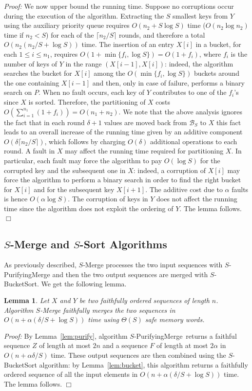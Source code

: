 \documentclass[review,number]{elsarticle}
\newcommand{\BO}[1]{{O}\left(#1\right)}
\newcommand{\BT}[1]{{\Theta}\left(#1\right)}
\newtheorem{lemma}{Lemma}
\renewenvironment{proof}{\begin{trivlist}
                         \item[] {\em Proof:}}{\hfill $\Box$
                       \end{trivlist}}
\newcommand{\B}{\mathcal{B}}
\newcommand{\SMerge}{$S$-\textsf{Merge}}
\newcommand{\SSort}{$S$-\textsf{Sort}}
\newcommand{\SPurifyingMerge}{$S$-\textsf{PurifyingMerge}}
\newcommand{\SBucketSort}{$S$-\textsf{BucketSort}}
\begin{document}
\begin{proof}
We now upper bound the running time. Suppose no corruptions occur during the
execution of the algorithm. Extracting the $S$ smallest keys from $Y$ using the
auxiliary priority queue requires $\BO{n_2+S\log S}$ time ($\BO{n_2 \log n_2}$
time if $n_2<S$) for each of the $\lceil n_2/S\rceil$ rounds, and therefore a
total $\BO{n_2 (n_2/S +\log S)}$ time. The insertion of an entry $X[i]$ in a
bucket, for
each $1\leq i\leq n_1$, requires $\BO{1+\min\{f_i, \log S\}}=\BO{1+f_i}$, where
$f_i$ is the number of keys of $Y$ in the range $(X[i-1], X[i])$: indeed, the
algorithm searches the bucket for $X[i]$ among the $\BO{\min\{f_i, \log S\}}$
buckets around
the
one containing $X[i-1]$ and then, only in case of failure, performs a binary
search on $P$. When no fault occurs, each key of $Y$ contributes to one of the
$f_i$'s  since $X$ is sorted. Therefore,  the partitioning of $X$ costs
$\BO{\sum_{i=1}^{n_1} (1+f_i)} = \BO{n_1 + n_2}$. We note that the above
analysis ignores the fact that in each round $\delta+1$ values are moved back
from $\B_{S}$ to $X$ this fact
leads to an overall increase of the running time given by an additive component
$\BO{\delta \lceil n_2/S\rceil}$, which follows by charging $\BO{\delta}$
additional operations to each round. A fault in $X$ may affect the running time
required for partitioning $X$. In particular, each fault may force the algorithm
to pay $\BO{\log S}$ for the corrupted key and the subsequent one in $X$:
indeed, a corruption of $X[i]$ may force the algorithm to perform a binary
search in order to find the right bucket for $X[i]$ and for the subsequent
key $X[i+1]$. The additive cost due to $\alpha$ faults is hence $\BO{\alpha \log
S}$. The corruption of keys in $Y$ does not affect the running time since the
algorithm does not exploit the ordering of $Y$. The lemma follows.
\end{proof}

\subsection[SMerge and SSort Algorithms]{\SMerge{} and \SSort{}
Algorithms}\label{sec:merge} As previously described, \SMerge{} processes the
two input sequences with \SPurifyingMerge{} and then the two output sequences
are merged with \SBucketSort{}. We get the following lemma.
\begin{lemma}\label{lem:merge}
Let $X$ and $Y$ be two faithfully ordered sequences of length $n$. Algorithm
\SMerge{} faithfully merges the two sequences in $\BO{n + \alpha \left(\delta/S
+ \log S\right)}$ time  using $\BT{S}$ safe
memory words. 
\end{lemma}
\begin{proof}
By Lemma~\ref{lem:purify}, algorithm \SPurifyingMerge\ returns a faithful
sequence $Z$ of length at most $2n$ and a
sequence $F$ of length at most $2\alpha$ in $\BO{n+\alpha \delta /S}$ time.
These output sequences are then combined using the \SBucketSort{} algorithm:
by Lemma~\ref{lem:bucket}, this algorithm  returns a faithfully ordered
sequence of all the input elements in $\BO{n+\alpha \left(\delta /S +\log
S\right)}$ time. The lemma follows.
\end{proof}
\end{document}
